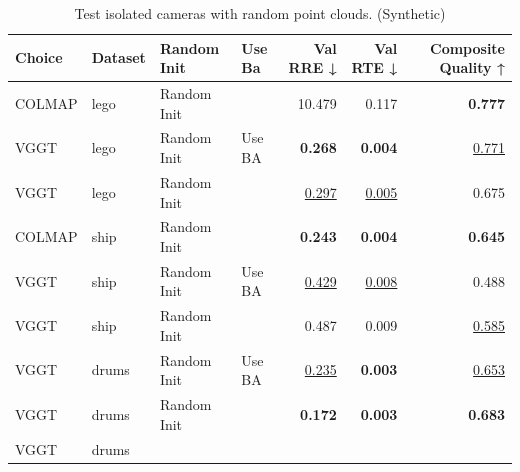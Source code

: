 \begin{table}[H]
\caption{\ifdefined\customcaption \customcaption \else Test isolated cameras with random point clouds. (Synthetic) \fi}
\label{tab:06_isolated_cams_synthetic}
\centering
\scriptsize
\begin{tabular}{llllrrr}
\toprule
Choice & Dataset & Random Init & Use Ba & Val RRE ↓ & Val RTE ↓ & Composite Quality ↑ \\
\midrule
COLMAP & lego & Random Init &  & 10.479 & 0.117 & \textbf{0.777} \\
VGGT & lego & Random Init & Use BA & \textbf{0.268} & \textbf{0.004} & \underline{0.771} \\
VGGT & lego & Random Init &  & \underline{0.297} & \underline{0.005} & 0.675 \\
\midrule
COLMAP & ship & Random Init &  & \textbf{0.243} & \textbf{0.004} & \textbf{0.645} \\
VGGT & ship & Random Init & Use BA & \underline{0.429} & \underline{0.008} & 0.488 \\
VGGT & ship & Random Init &  & 0.487 & 0.009 & \underline{0.585} \\
\midrule
VGGT & drums & Random Init & Use BA & \underline{0.235} & \textbf{0.003} & \underline{0.653} \\
VGGT & drums & Random Init &  & \textbf{0.172} & \textbf{0.003} & \textbf{0.683} \\
VGGT & drums &  &  &  &  &  \\
\bottomrule
\end{tabular}
\end{table}